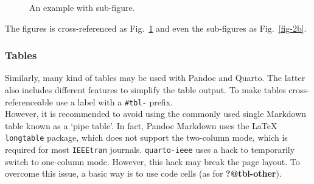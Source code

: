 \documentclass[
  journal,
]{IEEEtran}%
\theoremstyle{plain}
\theoremstyle{remark}
\begin{document}
\begin{figure}

\begin{minipage}{0.50\linewidth}


\subcaption{\label{fig-2a}}

\end{minipage}%
%
\begin{minipage}{0.50\linewidth}


\subcaption{\label{fig-2b}}

\end{minipage}%

\caption{\label{fig-2}An example with sub-figure.}

\end{figure}%

The figures is cross-referenced as Fig.~\ref{fig-2} and even the
sub-figures as Fig.~\ref{fig-2b}.

\subsubsection{Tables}\label{sec-tables}

Similarly, many kind of tables may be used with Pandoc and Quarto. The
latter also includes different features to simplify the table output. To
make tables cross-referenceable use a label with a \texttt{\#tbl-}
prefix.\\
However, it is recommended to avoid using the commonly used single
Markdown table known as a `pipe table'. In fact, Pandoc Markdown uses
the {\LaTeX} \texttt{longtable} package, which does not support the
two-column mode, which is required for most \texttt{IEEEtran} journals.
\texttt{quarto-ieee} uses a hack to temporarily switch to one-column
mode. However, this hack may break the page layout. To overcome this
issue, a basic way is to use code cells (as for \textbf{?@tbl-other}).
\end{document}
